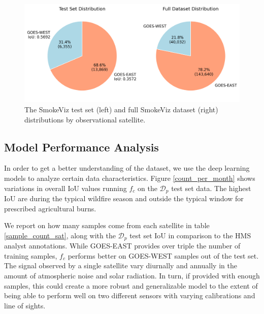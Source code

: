 \documentclass{article}
\begin{document}
\begin{figure}[!htb]
    \centering
    \includegraphics[width=\linewidth]{stat_figs/satellite_test_full_dataset.png}
    \caption{The SmokeViz test set (left) and full SmokeViz dataset (right) distributions by observational satellite.}\label{all_bands}
\end{figure}

\subsection{Model Performance Analysis}

In order to get a better understanding of the dataset, we use the deep learning models to analyze certain data characteristics. Figure \ref{count_per_month} shows variations in overall IoU values running \(f_{c}\) on the \(\mathcal{D}_p\) test set data. The highest IoU are during the typical wildfire season and outside the typical window for prescribed agricultural burns. 

We report on how many samples come from each satellite in table \ref{sample_count_sat}, along with the \(\mathcal{D}_p\) test set IoU in comparison to the HMS analyst annotations. While GOES-EAST provides over triple the number of training samples, \(f_c\) performs better on GOES-WEST samples out of the test set. The signal observed by a single satellite vary diurnally and annually in the amount of atmospheric noise and solar radiation. In turn, if provided with enough samples, this could create a more robust and generalizable model to the extent of being able to perform well on two different sensors with varying calibrations and line of sights. 
\end{document}
